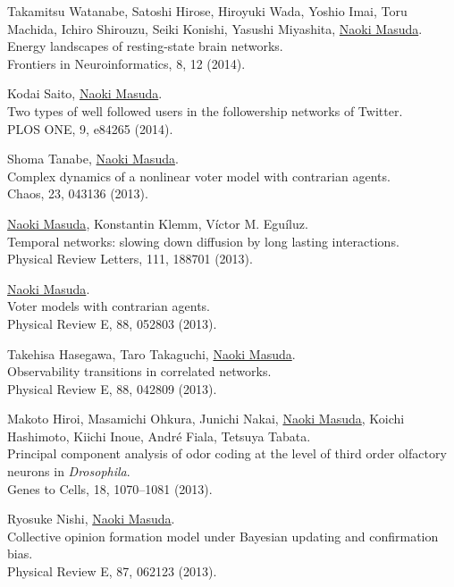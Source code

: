 \documentclass[11pt,letter]{article}
\begin{document}
\begin{etaremune}
\item Takamitsu Watanabe, Satoshi Hirose, Hiroyuki Wada, Yoshio Imai, Toru Machida, Ichiro Shirouzu, Seiki Konishi, Yasushi Miyashita, \underline{Naoki Masuda}.\\
Energy landscapes of resting-state brain networks.\\
Frontiers in Neuroinformatics, 8, 12 (2014).

\item Kodai Saito, \underline{Naoki Masuda}.\\
Two types of well followed users in the followership networks of Twitter.\\
PLOS ONE, 9, e84265 (2014).

\item Shoma Tanabe, \underline{Naoki Masuda}.\\
Complex dynamics of a nonlinear voter model with contrarian agents.\\
Chaos, 23, 043136 (2013).

\item \underline{Naoki Masuda}, Konstantin Klemm, V\'{i}ctor M. Egu\'{i}luz.\\
Temporal networks: slowing down diffusion by long lasting interactions.\\
Physical Review Letters, 111, 188701 (2013).

\item \underline{Naoki Masuda}.\\
Voter models with contrarian agents.\\
Physical Review E, 88, 052803 (2013).

\item Takehisa Hasegawa, Taro Takaguchi, \underline{Naoki Masuda}.\\
Observability transitions in correlated networks.\\
Physical Review E, 88, 042809 (2013).

\item Makoto Hiroi, Masamichi Ohkura, Junichi Nakai, \underline{Naoki Masuda}, Koichi Hashimoto, Kiichi Inoue, Andr\'{e} Fiala, Tetsuya Tabata.\\
Principal component analysis of odor coding at the level of third order olfactory neurons in \textit{Drosophila}.\\
Genes to Cells, 18, 1070--1081 (2013).

\item Ryosuke Nishi, \underline{Naoki Masuda}.\\
Collective opinion formation model under Bayesian updating and confirmation bias.\\
Physical Review E, 87, 062123 (2013).


\end{etaremune}
\end{document}
